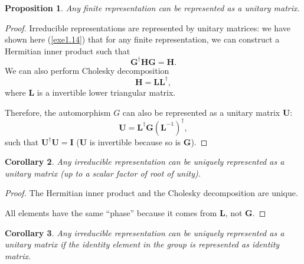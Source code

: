 \documentclass[12pt, letterpaper]{article}
\newcommand{\idm}{\mathbf{I}}
\newcommand{\hadj}[1]{{#1}^{\dagger}}
\newtheorem{prop}{Proposition}[section]
\newtheorem{cor}[prop]{Corollary}
\theoremstyle{definition}
\theoremstyle{remark}
\theoremstyle{definition}
\theoremstyle{plain}
\numberwithin{equation}{section}
\begin{document}
	\begin{prop}\label{propRepUnitary}
		Any finite representation can be represented as a unitary matrix.
	\end{prop}
	\begin{proof}
		Irreducible representations are represented by unitary matrices:
		we have shown here (\autoref{exe1.14}) that
		for any finite representation, we can construct a Hermitian inner product such that
		\[\hadj{\mathbf{G}}\mathbf{H}\mathbf{G}=\mathbf{H}.\]
		We can also perform Cholesky decomposition
		\[\mathbf{H}=\mathbf{L}\hadj{\mathbf{L}},\]
		where $\mathbf{L}$ is 
		a invertible lower triangular matrix.
		
		Therefore, the automorphism $G$ can also be represented as a unitary matrix $\mathbf{U}$:
		\[\mathbf{U}=\hadj{\mathbf{L}}\mathbf{G}\hadj{(\mathbf{L}^{-1})},\]
		such that $\hadj{\mathbf{U}}\mathbf{U}=\idm$ ($\mathbf{U}$ is invertible because so is $\mathbf{G}$).
	\end{proof}
	\begin{cor}
		Any irreducible representation can be uniquely represented as a unitary matrix (up to a scalar factor of root of unity).
	\end{cor}
	\begin{proof}
		The Hermitian inner product and the Cholesky decomposition are unique.
		
		All elements have the same ``phase'' because it comes from $\mathbf{L}$, not $\mathbf{G}$.
	\end{proof}
	\begin{cor}
		Any irreducible representation can be uniquely represented as a unitary matrix if the identity element in the group
		is represented as identity matrix.
	\end{cor}
\end{document}
